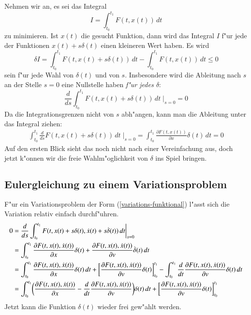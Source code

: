 Nehmen wir an, es sei das Integral
\begin{equation}
I=\int_{t_0}^{t_1} F(t, x(t)) \,dt
\end{equation}
zu minimieren. Ist $x(t)$ die gesucht Funktion, dann
wird das Integral $I$ f"ur jede der Funktionen $x(t)+s\delta(t)$
einen kleineren Wert haben. Es wird
\begin{equation}
\delta I =
\int_{t_0}^{t_1}F(t, x(t) + s\delta(t))\,dt
-
\int_{t_0}^{t_1}F(t, x(t))\,dt\le 0
\end{equation}
sein f"ur jede Wahl von $\delta(t)$ und von $s$. Insbesondere wird die
Ableitung nach $s$ an der Stelle $s=0$ eine Nullstelle haben
{\it f"ur jedes $\delta$}:
\begin{equation}
\frac{d}{ds}\int_{t_0}^{t_1}F(t,x(t)+s\delta(t))\,dt\;\bigg|_{s=0}=0
\end{equation}
Da die Integrationsgrenzen nicht von $s$ abh"angen, kann man die
Ableitung unter das Integral ziehen:
\begin{align*}
\int_{t_0}^{t_1}\frac{d}{ds}F(t, x(t)+s\delta(t))\,dt\;\bigg|_{s=0}
=
\int_{t_0}^{t_1}\frac{\partial F(t, x(t))}{\partial x}\delta(t)\,dt=0
\end{align*}
Auf den ersten Blick sieht das noch nicht nach einer Vereinfachung aus,
doch jetzt k"onnen wir die freie Wahlm"oglichkeit von $\delta$ ins
Spiel bringen.

\subsection{Eulergleichung zu einem Variationsproblem}
F"ur ein Variationsproblem der Form (\ref{variations-funktional})
l"asst sich die Variation relativ einfach durchf"uhren.
\begin{align}
0&=
\frac{d}{ds}
\int_{t_0}^{t_1} F(t, x(t) + s\delta(t), \dot x(t)+s\dot\delta(t))\,dt\bigg|_{s=0}
\notag
\\
&=
\int_{t_0}^{t_1} \frac{\partial F(t,x(t),\dot x(t))}{\partial x}\delta(t)
+\frac{\partial F(t,x(t),\dot x(t))}{\partial v}\dot \delta(t)\,dt
\notag
\\
&=
\int_{t_0}^{t_1} \frac{\partial F(t,x(t),\dot x(t))}{\partial x}\delta(t)\,dt
+\biggl[
\frac{\partial F(t,x(t),\dot x(t))}{\partial v}
\delta(t)
\biggr]_{t_0}^{t_1}
-\int_{t_0}^{t_1}\frac{d}{dt}\frac{\partial F(t,x(t),\dot x(t))}{\partial v}
\delta(t)\,dt
\notag
\\
&=
\int_{t_0}^{t_1}
\biggl(
\frac{\partial F(t,x(t),\dot x(t))}{\partial x}
-
\frac{d}{dt}\frac{\partial F(t,x(t),\dot x(t))}{\partial v}
\biggr)\delta(t)
\,dt
+\biggl[
\frac{\partial F(t,x(t),\dot x(t))}{\partial v}
\delta(t)
\biggr]_{t_0}^{t_1}
\label{euler-1}
\end{align}
Jetzt kann die Funktion $\delta(t)$ wieder frei gew"ahlt werden. 

